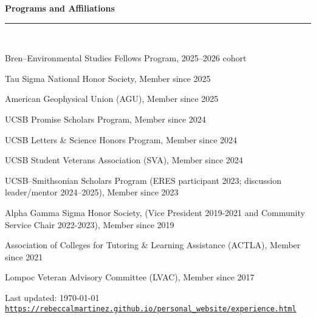 \documentclass[letterpaper]{article}
\def\footerlink{https://rebeccalmartinez.github.io/personal_website/experience.html}
\newcommand{\sectionheader}[1]{%
  \noindent\textbf{\Large #1}\\[-1.5ex]
  \noindent\rule{\linewidth}{0.4pt}\\[-1.5ex]
}
\renewenvironment{itemize}{
  \begin{list}{}{
    \setlength{\leftmargin}{1.5em}
  }
}{
  \end{list}
}
\begin{document}
\sectionheader{Programs and Affiliations}

\begin{itemize}
\item Bren–Environmental Studies Fellows Program, 2025–2026 cohort
\item Tau Sigma National Honor Society, Member since 2025
\item American Geophysical Union (AGU), Member since 2025
\item UCSB Promise Scholars Program, Member since 2024
\item UCSB Letters \& Science Honors Program, Member since 2024
\item UCSB Student Veterans Association (SVA), Member since 2024
\item UCSB–Smithsonian Scholars Program (ERES participant 2023; discussion leader/mentor 2024–2025), Member since 2023
\item Alpha Gamma Sigma Honor Society, (Vice President 2019-2021 and Community Service Chair 2022-2023), Member since 2019
\item Association of Colleges for Tutoring \& Learning Assistance (ACTLA), Member since 2021
\item Lompoc Veteran Advisory Committee (LVAC), Member since 2017
\end{itemize}

 
\bigskip

\begin{center}
  \begin{footnotesize}
    Last updated: \today \\
    \href{\footerlink}{\texttt{\footerlink}}
  \end{footnotesize}
\end{center}
\end{document}
